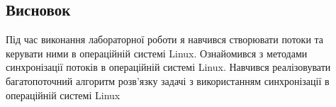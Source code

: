 \documentclass{article}
\begin{document}
\begin{normalsize}
	\section*{Висновок}
	Під час виконання лабораторної роботи я навчився створювати потоки та керувати ними в операційній системі Linux. Ознайомився з методами синхронізації потоків в операційній системі Linux. Навчився реалізовувати багатопоточний алгоритм розв’язку
	задачі з використанням синхронізації в операційній системі Linux
	
	 
\end{normalsize}
\end{document}
